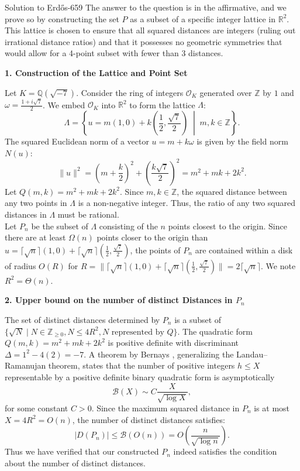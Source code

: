 \documentclass{article}
\theoremstyle{plain}
\theoremstyle{definition}
\begin{document}
\begin{solution}{Solution to {Erdős-659}}
The answer to the question is in the affirmative, and we prove so by constructing the set $P$ as a subset of a specific integer lattice in $\mathbb{R}^2$. This lattice is chosen to ensure that all squared distances are integers (ruling out irrational distance ratios) and that it possesses no geometric symmetries that would allow for a 4-point subset with fewer than 3 distances.

\medskip
\textbf{1. Construction of the Lattice and Point Set}

Let $K = \mathbb{Q}(\sqrt{-7})$. Consider the ring of integers $\mathcal{O}_K$ generated over $\mathbb{Z}$ by $1$ and $\omega = \frac{1 + i\sqrt{7}}{2}$. We embed $\mathcal{O}_K$ into $\mathbb{R}^2$ to form the lattice $\Lambda$:
\[ \Lambda = \left\{ u = m(1, 0) + k\left(\frac{1}{2}, \frac{\sqrt{7}}{2}\right) \;\middle|\; m, k \in \mathbb{Z} \right\}. \]
The squared Euclidean norm of a vector $u = m + k\omega$ is given by the field norm $N(u)$:
\[ \|u\|^2 = \left(m + \frac{k}{2}\right)^2 + \left(\frac{k\sqrt{7}}{2}\right)^2 = m^2 + mk + 2k^2. \]
Let $Q(m, k) = m^2 + mk + 2k^2$. Since $m, k \in \mathbb{Z}$, the squared distance between any two points in $\Lambda$ is a non-negative integer. Thus, the ratio of any two squared distances in $\Lambda$ must be rational.\\
Let $P_n$ be the subset of $\Lambda$ consisting of the $n$ points closest to the origin. Since there are at least $\Omega(n)$ points closer to the origin than $u=\lceil\sqrt{n}\rceil(1,0)+\lceil\sqrt{n}\rceil\left(\frac{1}{2},\frac{\sqrt{7}}{2}\right)$, the points of $P_n$ are contained within a disk of radius $O(R)$ for $R=\|\lceil\sqrt{n}\rceil(1,0)+\lceil\sqrt{n}\rceil\left(\frac{1}{2},\frac{\sqrt{7}}{2}\right)\|=2\lceil\sqrt{n}\rceil$. We note $R^2 = \Theta(n)$.

\medskip
\textbf{2. Upper bound on the number of distinct Distances in $P_n$}

The set of distinct distances determined by $P_n$ is a subset of $\{\sqrt{N} \mid N \in \mathbb{Z}_{\ge 0}, N \le 4R^2, N \text{ represented by } Q\}$. 
The quadratic form $Q(m, k) = m^2 + mk + 2k^2$ is positive definite with discriminant $\Delta = 1^2 - 4(2) = -7$.
A theorem by Bernays \cite{Bernays1912}, generalizing the Landau--Ramanujan theorem, states that the number of positive integers $h \le X$ representable by a positive definite binary quadratic form is asymptotically
\[ \mathcal{B}(X) \sim C \frac{X}{\sqrt{\log X}}, \]
for some constant $C > 0$. Since the maximum squared distance in $P_n$ is at most $X = 4R^2 = O(n)$, the number of distinct distances satisfies:
\[ |D(P_n)| \le \mathcal{B}(O(n)) = O\left(\frac{n}{\sqrt{\log n}}\right). \]
Thus we have verified that our constructed $P_n$ indeed satisfies the condition about the number of distinct distances.


\end{solution}
\end{document}
